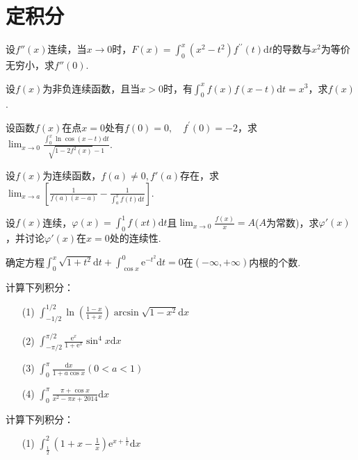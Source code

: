 \section{定积分}
\begin{xiti}
	\item 设$f''(x)$连续，当$x\rightarrow 0$时，$F ( x ) = \int _ { 0 } ^ { x } \left( x ^ { 2 } - t ^ { 2 } \right) f ^ { \prime \prime } ( t ) \mathrm { d } t$的导数与$x^{2}$为等价无穷小，求$f''(0)$.
	\item 设$f(x)$为非负连续函数，且当$x>0$时，有$\int _ { 0 } ^ { x } f ( x ) f ( x - t ) \mathrm { d } t = x ^ { 3 }$，求$f(x)$.
	\item 设函数$f(x)$在点$x=0$处有$f ( 0 ) = 0 , \quad f ^ { \prime } ( 0 ) = - 2$，求$\lim _ { x \rightarrow 0 } \frac { \int _ { 0 } ^ { x } \ln \cos ( x - t ) \mathrm { d } t } { \sqrt { 1 - 2 f ^ { 2 } ( x ) } - 1 }$.
	\item 设$f(x)$为连续函数，$f(a)\ne 0,f'(a)$存在，求$\lim _ { x \rightarrow a } \left[ \frac { 1 } { f ( a ) ( x - a ) } - \frac { 1 } { \int _ { a } ^ { x } f ( t ) \mathrm { d } t } \right]$.
	\item 设$f(x)$连续，$\varphi ( x ) = \int _ { 0 } ^ { 1 } f ( x t ) \mathrm { d } t$且$\lim _ { x \rightarrow 0 } \frac { f ( x ) } { x } = A$($A$为常数)，求$\varphi'(x)$，并讨论$\varphi'(x)$在$x=0$处的连续性.
	\item 确定方程$\int _ { 0 } ^ { x } \sqrt { 1 + t ^ { 2 } } \mathrm { d } t + \int _ { \cos x } ^ { 0 } \mathrm { e } ^ { - t ^ { 2 } } \mathrm { d } t = 0$在$(-\infty,+\infty)$内根的个数.
	\item 计算下列积分：
	\begin{enumerate}
		\item [(1)]$\int _ { - 1 / 2 } ^ { 1 / 2 } \ln \left( \frac { 1 - x } { 1 + x } \right) \arcsin \sqrt { 1 - x ^ { 2 } } \mathrm { d } x$
		\item [(2)]$\int _ { - \pi / 2 } ^ { \pi / 2 } \frac { \mathrm { e } ^ { x } } { 1 + \mathrm { e } ^ { x } } \sin ^ { 4 } x \mathrm { d } x$
		\item [(3)]$\int _ { 0 } ^ { \pi } \frac { \mathrm { d } x } { 1 + a \cos x } ( 0 < a < 1 )$
		\item [(4)]$\int _ { 0 } ^ { \pi } \frac { \pi + \cos x } { x ^ { 2 } - \pi x + 2014 } \mathrm { d } x$
	\end{enumerate}
\item 计算下列积分：
\begin{enumerate}
	\item [(1)]$\int _ { \frac { 1 } { 2 } } ^ { 2 } \left( 1 + x - \frac { 1 } { x } \right) \mathrm { e } ^ { x + \frac { 1 } { x } } \mathrm { d } x$

\end{enumerate}
\end{xiti}

